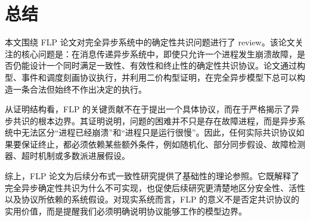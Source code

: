 \section{总结}

本文围绕 FLP 论文对完全异步系统中的确定性共识问题进行了 review。该论文关注的核心问题是：在消息传递异步系统中，即使只允许一个进程发生崩溃故障，是否仍能设计一个同时满足一致性、有效性和终止性的确定性共识协议。论文通过构型、事件和调度刻画协议执行，并利用二价构型证明，在完全异步模型下总可以构造一条合法但始终不作出决定的执行。

从证明结构看，FLP 的关键贡献不在于提出一个具体协议，而在于严格揭示了异步共识的根本边界。其证明说明，问题的困难并不只是存在故障进程，而是异步系统中无法区分“进程已经崩溃”和“进程只是运行很慢”。因此，任何实际共识协议如果要保证终止，都必须依赖某些额外条件，例如随机化、部分同步假设、故障检测器、超时机制或多数派进展假设。

综上，FLP 论文为后续分布式一致性研究提供了基础性的理论参照。它既解释了完全异步确定性共识为什么不可实现，也促使后续研究更清楚地区分安全性、活性以及协议所依赖的系统假设。对现实系统而言，FLP 的意义不是否定共识协议的实用价值，而是提醒我们必须明确说明协议能够工作的模型边界。
